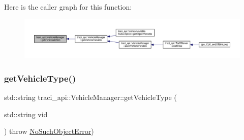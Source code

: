 Here is the caller graph for this function\+:
\nopagebreak
\begin{figure}[H]
\begin{center}
\leavevmode
\includegraphics[width=350pt]{classtraci__api_1_1_vehicle_manager_ae70d2421d4a96ab7601dabb6fcc512b2_icgraph}
\end{center}
\end{figure}
\mbox{\label{classtraci__api_1_1_vehicle_manager_a946553555fa7a2a9f95b4baced6f0dbe}} 
\subsubsection{\texorpdfstring{get\+Vehicle\+Type()}{getVehicleType()}}
{\footnotesize\ttfamily std\+::string traci\+\_\+api\+::\+Vehicle\+Manager\+::get\+Vehicle\+Type (\begin{DoxyParamCaption}\item[{std\+::string}]{vid }\end{DoxyParamCaption}) throw  \hyperlink{classtraci__api_1_1_no_such_object_error}{No\+Such\+Object\+Error}) }

